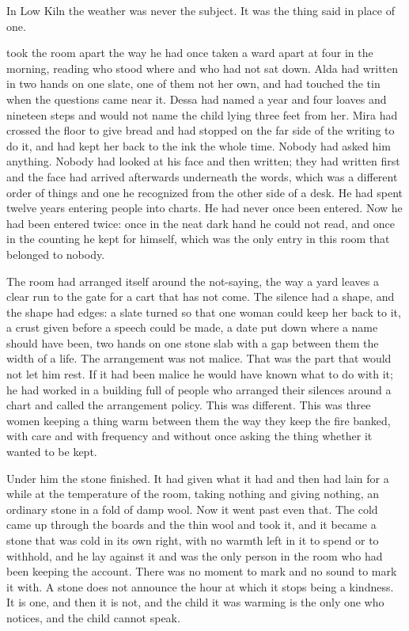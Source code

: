 In Low Kiln the weather was never the subject. It was the thing said in place of one.

 took the room apart the way he had once taken a ward apart at four in the morning, reading who stood where and who had not sat down. Alda had written in two hands on one slate, one of them not her own, and had touched the tin when the questions came near it. Dessa had named a year and four loaves and nineteen steps and would not name the child lying three feet from her. Mira had crossed the floor to give bread and had stopped on the far side of the writing to do it, and had kept her back to the ink the whole time. Nobody had asked him anything. Nobody had looked at his face and then written; they had written first and the face had arrived afterwards underneath the words, which was a different order of things and one he recognized from the other side of a desk. He had spent twelve years entering people into charts. He had never once been entered. Now he had been entered twice: once in the neat dark hand he could not read, and once in the counting he kept for himself, which was the only entry in this room that belonged to nobody.

The room had arranged itself around the not-saying, the way a yard leaves a clear run to the gate for a cart that has not come. The silence had a shape, and the shape had edges: a slate turned so that one woman could keep her back to it, a crust given before a speech could be made, a date put down where a name should have been, two hands on one stone slab with a gap between them the width of a life. The arrangement was not malice. That was the part that would not let him rest. If it had been malice he would have known what to do with it; he had worked in a building full of people who arranged their silences around a chart and called the arrangement policy. This was different. This was three women keeping a thing warm between them the way they keep the fire banked, with care and with frequency and without once asking the thing whether it wanted to be kept.

Under him the stone finished. It had given what it had and then had lain for a while at the temperature of the room, taking nothing and giving nothing, an ordinary stone in a fold of damp wool. Now it went past even that. The cold came up through the boards and the thin wool and took it, and it became a stone that was cold in its own right, with no warmth left in it to spend or to withhold, and he lay against it and was the only person in the room who had been keeping the account. There was no moment to mark and no sound to mark it with. A stone does not announce the hour at which it stops being a kindness. It is one, and then it is not, and the child it was warming is the only one who notices, and the child cannot speak.


